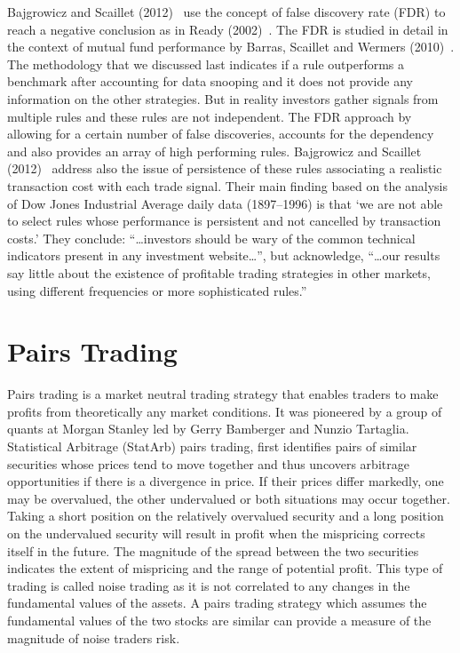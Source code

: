 Bajgrowicz and Scaillet (2012)~\cite{bajgrowicz2012technical} use the concept of false discovery rate (FDR) to reach a negative conclusion as in Ready (2002)~\cite{ready}. The FDR is studied in detail in the context of mutual fund performance by Barras, Scaillet and Wermers (2010)~\cite{barras2010false}. The methodology that we discussed last indicates if a rule outperforms a benchmark after accounting for data snooping and it does not provide any information on the other strategies. But in reality investors gather signals from multiple rules and these rules are not independent. The FDR approach by allowing for a certain number of false discoveries, accounts for the dependency and also provides an array of high performing rules. Bajgrowicz and Scaillet (2012)~\cite{bajgrowicz2012technical} address also the issue of persistence of these rules associating a realistic transaction cost with each trade signal. Their main finding based on the analysis of Dow Jones Industrial Average daily data (1897--1996) is that `we are not able to select rules whose performance is persistent and not cancelled by transaction costs.' They conclude: ``\dots investors should be wary of the common technical indicators present in any investment website\dots'', but acknowledge, ``\dots our results say little about the existence of profitable trading strategies in other markets, using different frequencies or more sophisticated rules.''


\section{Pairs Trading}


Pairs trading is a market neutral trading strategy that enables traders to make profits from theoretically any market conditions. It was pioneered by a group of quants at Morgan Stanley led by Gerry Bamberger and Nunzio Tartaglia. Statistical Arbitrage (StatArb) pairs trading, first identifies pairs of similar securities whose prices tend to move together and thus uncovers arbitrage opportunities if there is a divergence in price. If their prices differ markedly, one may be overvalued, the other undervalued or both situations may occur together. Taking a short position on the relatively overvalued security and a long position on the undervalued security will result in profit when the mispricing corrects itself in the future. The magnitude of the spread between the two securities indicates the extent of mispricing and the range of potential profit. This type of trading is called noise trading as it is not correlated to any changes in the fundamental values of the assets. A pairs trading strategy which assumes the fundamental values of the two stocks are similar can provide a measure of the magnitude of noise traders risk.


